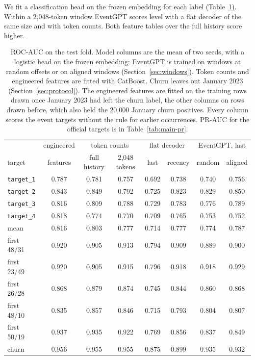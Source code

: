 \documentclass[12pt]{article}
\newcommand{\tok}[1]{\texttt{#1}}
\begin{document}
We fit a classification head on the frozen embedding for each label (Table~\ref{tab:main}). Within a 2,048-token window EventGPT scores level with a flat decoder of the same size and with token counts. Both feature tables over the full history score higher.

\begin{table}[htbp]
\centering
\small
\setlength{\tabcolsep}{4pt}
\caption{ROC-AUC on the test fold. Model columns are the mean of two seeds, with a logistic head on the frozen embedding; EventGPT is trained on windows at random offsets or on aligned windows
(Section~\ref{sec:windows}). Token counts and engineered features are fitted with CatBoost. Churn leaves out January 2023 (Section~\ref{sec:protocol}). The engineered features are fitted on the training rows drawn once January 2023 had left the churn label, the other columns on rows drawn before, which also held the 20,000 January churn positives. Every column scores the event targets without the rule for earlier occurrences. PR-AUC for the official targets is in Table~\ref{tab:main-pr}.}
\label{tab:main}
\begin{tabular}{lccccccc}
\toprule
 & engineered & \multicolumn{2}{c}{token counts} & \multicolumn{2}{c}{flat decoder} & \multicolumn{2}{c}{EventGPT, last} \\
target & features & full history & 2,048 tokens & last & recency & random & aligned \\
\midrule
\tok{target\_1} & 0.787 & 0.781 & 0.757 & 0.692 & 0.738 & 0.740 & 0.756 \\
\tok{target\_2} & 0.843 & 0.849 & 0.792 & 0.725 & 0.823 & 0.829 & 0.850 \\
\tok{target\_3} & 0.816 & 0.809 & 0.788 & 0.729 & 0.783 & 0.776 & 0.789 \\
\tok{target\_4} & 0.818 & 0.774 & 0.770 & 0.709 & 0.765 & 0.753 & 0.752 \\
mean & 0.816 & 0.803 & 0.777 & 0.714 & 0.777 & 0.774 & 0.787 \\
\midrule
first 48/31 & 0.920 & 0.905 & 0.913 & 0.794 & 0.909 & 0.889 & 0.900 \\
first 23/49 & 0.920 & 0.905 & 0.915 & 0.796 & 0.918 & 0.918 & 0.929 \\
first 26/28 & 0.868 & 0.879 & 0.874 & 0.745 & 0.844 & 0.860 & 0.868 \\
first 48/10 & 0.835 & 0.857 & 0.846 & 0.715 & 0.793 & 0.804 & 0.807 \\
first 50/19 & 0.937 & 0.935 & 0.922 & 0.769 & 0.856 & 0.837 & 0.849 \\
churn & 0.956 & 0.955 & 0.955 & 0.875 & 0.899 & 0.935 & 0.932 \\
\bottomrule
\end{tabular}
\end{table}
\end{document}
